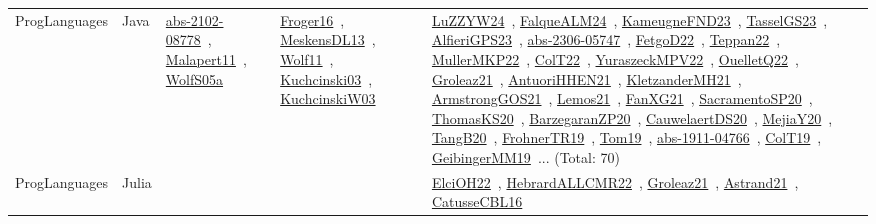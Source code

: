 {\begin{longtable}{lp{3cm}>{\raggedright\arraybackslash}p{6cm}>{\raggedright\arraybackslash}p{6cm}>{\raggedright\arraybackslash}p{8cm}}
\index{Java}\index{ProgLanguages!Java}ProgLanguages & Java & \href{../works/abs-2102-08778.pdf}{abs-2102-08778}~\cite{abs-2102-08778}, \href{../works/Malapert11.pdf}{Malapert11}~\cite{Malapert11}, \href{../works/WolfS05a.pdf}{WolfS05a}~\cite{WolfS05a} & \href{../works/Froger16.pdf}{Froger16}~\cite{Froger16}, \href{../works/MeskensDL13.pdf}{MeskensDL13}~\cite{MeskensDL13}, \href{../works/Wolf11.pdf}{Wolf11}~\cite{Wolf11}, \href{../works/Kuchcinski03.pdf}{Kuchcinski03}~\cite{Kuchcinski03}, \href{../works/KuchcinskiW03.pdf}{KuchcinskiW03}~\cite{KuchcinskiW03} & \href{../works/LuZZYW24.pdf}{LuZZYW24}~\cite{LuZZYW24}, \href{../works/FalqueALM24.pdf}{FalqueALM24}~\cite{FalqueALM24}, \href{../works/KameugneFND23.pdf}{KameugneFND23}~\cite{KameugneFND23}, \href{../works/TasselGS23.pdf}{TasselGS23}~\cite{TasselGS23}, \href{../works/AlfieriGPS23.pdf}{AlfieriGPS23}~\cite{AlfieriGPS23}, \href{../works/abs-2306-05747.pdf}{abs-2306-05747}~\cite{abs-2306-05747}, \href{../works/FetgoD22.pdf}{FetgoD22}~\cite{FetgoD22}, \href{../works/Teppan22.pdf}{Teppan22}~\cite{Teppan22}, \href{../works/MullerMKP22.pdf}{MullerMKP22}~\cite{MullerMKP22}, \href{../works/ColT22.pdf}{ColT22}~\cite{ColT22}, \href{../works/YuraszeckMPV22.pdf}{YuraszeckMPV22}~\cite{YuraszeckMPV22}, \href{../works/OuelletQ22.pdf}{OuelletQ22}~\cite{OuelletQ22}, \href{../works/Groleaz21.pdf}{Groleaz21}~\cite{Groleaz21}, \href{../works/AntuoriHHEN21.pdf}{AntuoriHHEN21}~\cite{AntuoriHHEN21}, \href{../works/KletzanderMH21.pdf}{KletzanderMH21}~\cite{KletzanderMH21}, \href{../works/ArmstrongGOS21.pdf}{ArmstrongGOS21}~\cite{ArmstrongGOS21}, \href{../works/Lemos21.pdf}{Lemos21}~\cite{Lemos21}, \href{../works/FanXG21.pdf}{FanXG21}~\cite{FanXG21}, \href{../works/SacramentoSP20.pdf}{SacramentoSP20}~\cite{SacramentoSP20}, \href{../works/ThomasKS20.pdf}{ThomasKS20}~\cite{ThomasKS20}, \href{../works/BarzegaranZP20.pdf}{BarzegaranZP20}~\cite{BarzegaranZP20}, \href{../works/CauwelaertDS20.pdf}{CauwelaertDS20}~\cite{CauwelaertDS20}, \href{../works/MejiaY20.pdf}{MejiaY20}~\cite{MejiaY20}, \href{../works/TangB20.pdf}{TangB20}~\cite{TangB20}, \href{../works/FrohnerTR19.pdf}{FrohnerTR19}~\cite{FrohnerTR19}, \href{../works/Tom19.pdf}{Tom19}~\cite{Tom19}, \href{../works/abs-1911-04766.pdf}{abs-1911-04766}~\cite{abs-1911-04766}, \href{../works/ColT19.pdf}{ColT19}~\cite{ColT19}, \href{../works/GeibingerMM19.pdf}{GeibingerMM19}~\cite{GeibingerMM19}... (Total: 70)\\
\index{Julia}\index{ProgLanguages!Julia}ProgLanguages & Julia &  &  & \href{../works/ElciOH22.pdf}{ElciOH22}~\cite{ElciOH22}, \href{../works/HebrardALLCMR22.pdf}{HebrardALLCMR22}~\cite{HebrardALLCMR22}, \href{../works/Groleaz21.pdf}{Groleaz21}~\cite{Groleaz21}, \href{../works/Astrand21.pdf}{Astrand21}~\cite{Astrand21}, \href{../works/CatusseCBL16.pdf}{CatusseCBL16}~\cite{CatusseCBL16}\\

\end{longtable}}
